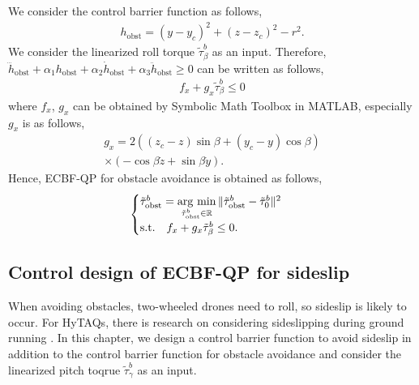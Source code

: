 We consider the control barrier function as follows,
\begin{align*}
    h_{\mathrm{obst}} = (y- y_c)^2 + (z- z_c)^2 - r^2.
\end{align*}
We consider the linearized roll torque $ \tilde{\tau}_{\beta}^b $ as an input.
Therefore, $ \dddot{h}_{\mathrm{obst}} + \alpha_1 h_{\mathrm{obst}} + \alpha_2 \dot{h}_{\mathrm{obst}} + \alpha_3 \ddot{h}_{\mathrm{obst}} \geq 0 $ can be written as follows,
\begin{align}
    \label{eq:obstQP}
    f_x + g_x \tilde{\tau}_{\beta}^b \leq 0
\end{align}
where $ f_x $, $ g_x $ can be obtained by  Symbolic Math Toolbox in MATLAB, especially $ g_x $ is as follows,
\begin{align*}
    g_x = 2 \left ( \left (z_c - z \right ) \sin \beta + \left (y_c - y \right ) \cos \beta \right ) \\
    \times (- \cos \beta \dot{z} + \sin \beta \dot{y}).
\end{align*}
Hence, ECBF-QP for obstacle avoidance is obtained as follows,
\begin{align}
    \label{eq:obstQP_final}
    \begin{cases}
        \tilde{\tau}_{\mathrm{obst}}^b = \mathop{\rm arg~min}\limits_{\tilde{\tau}_{\mathrm{obst}}^b \in \mathbb{R}} \| \tilde{\tau}_{\mathrm{obst}}^b - \tilde{\tau}_0^b \| ^2 \\
        \mathrm{s.t.} \quad f_x + g_x \tilde{\tau}_{\beta}^b \leq 0.
        \end{cases}
\end{align}
\subsection{Control design of ECBF-QP for sideslip}
\label{subsec:sideslip}
When avoiding obstacles, two-wheeled drones need to roll, so sideslip is likely to occur.
For HyTAQs, there is research on considering sideslipping during ground running \cite{wuUnifiedTerrestrialAerial2023}.
In this chapter, we design a control barrier function to avoid sideslip in addition to the control barrier function for obstacle avoidance and consider the linearized pitch toqrue $ \tilde{\tau}_{\gamma}^b $ as an input.

